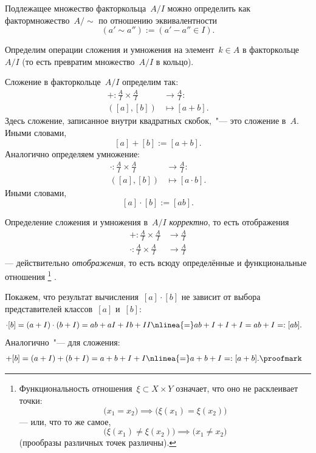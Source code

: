 \begin{remark}
	Подлежащее множество факторкольца~$A/I$ можно определить как фактормножество~$A/\sim$ по отношению эквивалентности
	\[
		(a' \sim a'') :=
		(a' - a'' \in I)
		.
	\]
\end{remark}

Определим операции сложения и умножения на элемент~$k \in A$ в факторкольце~$A/I$ (то есть превратим множество~$A/I$  в кольцо).

\begin{definition}
	Сложение в факторкольце~$A/I$ определим так:
	\begin{align*}
		+ \colon
		\frac{A}{I} \times \frac{A}{I} &\to \frac{A}{I}
		\colon
		\\
		([a], [b]) &\mapsto [a + b]
		.
	\end{align*}
	Здесь сложение, записанное внутри квадратных скобок,~"--- это сложение в~$A$. Иными словами,
	\[
		[a] + [b] := [a + b].
	\]
	Аналогично определяем умножение:
	\begin{align*}
		\cdot \colon
		\frac{A}{I} \times \frac{A}{I} &\to \frac{A}{I}
		\colon
		\\
		([a], [b]) &\mapsto [a \cdot b]
		.
	\end{align*}
	Иными словами,
	\[
		[a] \cdot [b] := [ab]
		.
	\]
\end{definition}

\begin{remark}
	Определение сложения и умножения в~$A/I$ \emph{корректно}, то есть отображения
	\begin{align*}
		+ \colon
		\frac{A}{I}
		\times
		\frac{A}{I}
		&\to
		\frac{A}{I}
		\\
		\cdot \colon
		\frac{A}{I}
		\times
		\frac{A}{I}
		&\to
		\frac{A}{I}
	\end{align*}
	--- действительно \emph{отображения}, то есть всюду определённые и функциональные отношения%
	\footnote{%
		Функциональность отношения~$\xi \subset X \times Y$ означает, что оно не расклеивает точки:
		\[
			\bigl( x_1 = x_2 \bigr)
			\implies
			\bigl(
				\xi(x_1) = \xi(x_2)
			\bigr)
		\]
		--- или, что то же самое,
		\[
			\bigl(
				\xi(x_1) \neq \xi(x_2)
			\bigr)
			\implies
			\bigl( x_1 \neq x_2 \bigr)
		\]
		(прообразы различных точек различны).
	}%
	.
\end{remark}
\begin{proofm}
	Покажем, что результат вычисления~$[a] \cdot [b]$ не зависит от выбора представителей классов~$[a]$ и~$[b]$:
	\begin{align*}
		[a] \cdot [b] &=
		(a + I) \cdot (b + I)
		=
		ab + aI + Ib + II
		\nlinea{=}
		ab + I + I + I
		=
		ab + I
		=:
		[ab]
		.
	\end{align*}
	Аналогично~"--- для сложения:
	\begin{align*}
		[a] + [b] &=
		(a + I) + (b + I)
		=
		a + b + I + I
		\nlinea{=}
		a + b + I
		=:
		[a+b]
		.
		\proofmark
	\end{align*}
\end{proofm}


